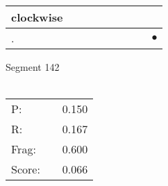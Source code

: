 \documentclass[landscape]{article}
\newcommand{\ssp}{\hspace{2pt}}
\newcommand{\mex}{\cellcolor{g}$\bullet$}
\begin{document}
\begin{tabular}{|l|p{10pt}|p{10pt}|p{10pt}|p{10pt}|p{10pt}|p{10pt}|p{10pt}|p{10pt}|}
\hline
\ssp clockwise \ssp&\hspace{2pt}&\hspace{2pt}&\hspace{2pt}&\hspace{2pt}&\hspace{2pt}&\hspace{2pt}&\hspace{2pt}&\hspace{2pt}\\
\hline
\ssp \cellcolor{ref7}. \ssp&\hspace{2pt}&\hspace{2pt}&\hspace{2pt}&\hspace{2pt}&\hspace{2pt}&\hspace{2pt}&\hspace{2pt}&\hspace{2pt}\mex\\
\hline
\end{tabular}

\vspace{6pt}
\noindent Segment 142\\\\
\noindent\begin{tabular}{lm{12pt}r}
\hline
P:&&0.150\\
R:&&0.167\\
Frag:&&0.600\\
Score:&&0.066\\
\end{tabular}

\newpage
\end{document}
